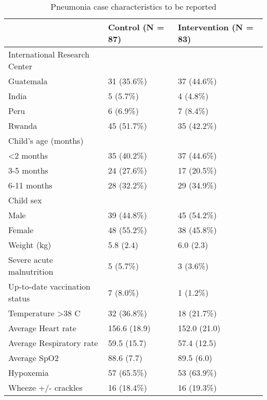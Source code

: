 \documentclass[
]{article}
\begin{document}
\begin{table}[H]

\caption{\label{tab:unnamed-chunk-6}Pneumonia case characteristics to be reported}
\centering
\begin{tabular}[t]{l|l|l}
\hline
  & Control (N = 87) & Intervention (N = 83)\\
\hline
International Research Center &  & \\
\hline
\hspace{1em}Guatemala & 31 (35.6\%) & 37 (44.6\%)\\
\hline
\hspace{1em}India & 5  (5.7\%) & 4  (4.8\%)\\
\hline
\hspace{1em}Peru & 6  (6.9\%) & 7  (8.4\%)\\
\hline
\hspace{1em}Rwanda & 45 (51.7\%) & 35 (42.2\%)\\
\hline
Child’s age (months) &  & \\
\hline
\hspace{1em}<2 months & 35 (40.2\%) & 37 (44.6\%)\\
\hline
\hspace{1em}3-5 months & 24 (27.6\%) & 17 (20.5\%)\\
\hline
\hspace{1em}6-11 months & 28 (32.2\%) & 29 (34.9\%)\\
\hline
Child sex &  & \\
\hline
\hspace{1em}Male & 39 (44.8\%) & 45 (54.2\%)\\
\hline
\hspace{1em}Female & 48 (55.2\%) & 38 (45.8\%)\\
\hline
Weight (kg) & 5.8 (2.4) & 6.0 (2.3)\\
\hline
Severe acute malnutrition & 5  (5.7\%) & 3  (3.6\%)\\
\hline
Up-to-date vaccination status & 7  (8.0\%) & 1  (1.2\%)\\
\hline
Temperature >38 C & 32 (36.8\%) & 18 (21.7\%)\\
\hline
Average Heart rate & 156.6 (18.9) & 152.0 (21.0)\\
\hline
Average Respiratory rate & 59.5 (15.7) & 57.4 (12.5)\\
\hline
Average SpO2 & 88.6 (7.7) & 89.5 (6.0)\\
\hline
Hypoxemia & 57 (65.5\%) & 53 (63.9\%)\\
\hline
Wheeze +/- crackles & 16 (18.4\%) & 16 (19.3\%)\\

\end{tabular}
\end{table}
\end{document}
